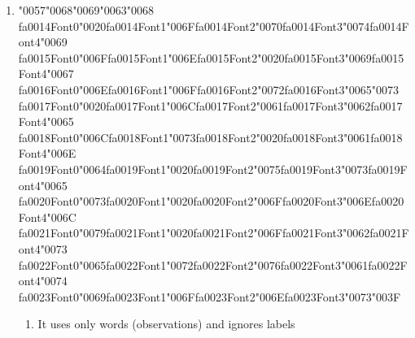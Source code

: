 \documentclass[12pt]{article}
\begin{document}
\begin{enumerate}[label=Q\arabic*.]
\begin{enumerate}[label=(\Alph*)]
    \item Beginning of an entity
    \item Inside an entity
    \item Outside any entity
    \item Between two tokens
\end{enumerate}
\item {\char"0057}{\char"0068}{\char"0069}{\char"0063}{\char"0068} {\csname fa0014Font0\endcsname\char"0020}{\csname fa0014Font1\endcsname\char"006F}{\csname fa0014Font2\endcsname\char"0070}{\csname fa0014Font3\endcsname\char"0074}{\csname fa0014Font4\endcsname\char"0069} {\csname fa0015Font0\endcsname\char"006F}{\csname fa0015Font1\endcsname\char"006E}{\csname fa0015Font2\endcsname\char"0020}{\csname fa0015Font3\endcsname\char"0069}{\csname fa0015Font4\endcsname\char"0067} {\csname fa0016Font0\endcsname\char"006E}{\csname fa0016Font1\endcsname\char"006F}{\csname fa0016Font2\endcsname\char"0072}{\csname fa0016Font3\endcsname\char"0065}{\char"0073} {\csname fa0017Font0\endcsname\char"0020}{\csname fa0017Font1\endcsname\char"006C}{\csname fa0017Font2\endcsname\char"0061}{\csname fa0017Font3\endcsname\char"0062}{\csname fa0017Font4\endcsname\char"0065} {\csname fa0018Font0\endcsname\char"006C}{\csname fa0018Font1\endcsname\char"0073}{\csname fa0018Font2\endcsname\char"0020}{\csname fa0018Font3\endcsname\char"0061}{\csname fa0018Font4\endcsname\char"006E} {\csname fa0019Font0\endcsname\char"0064}{\csname fa0019Font1\endcsname\char"0020}{\csname fa0019Font2\endcsname\char"0075}{\csname fa0019Font3\endcsname\char"0073}{\csname fa0019Font4\endcsname\char"0065} {\csname fa0020Font0\endcsname\char"0073}{\csname fa0020Font1\endcsname\char"0020}{\csname fa0020Font2\endcsname\char"006F}{\csname fa0020Font3\endcsname\char"006E}{\csname fa0020Font4\endcsname\char"006C} {\csname fa0021Font0\endcsname\char"0079}{\csname fa0021Font1\endcsname\char"0020}{\csname fa0021Font2\endcsname\char"006F}{\csname fa0021Font3\endcsname\char"0062}{\csname fa0021Font4\endcsname\char"0073} {\csname fa0022Font0\endcsname\char"0065}{\csname fa0022Font1\endcsname\char"0072}{\csname fa0022Font2\endcsname\char"0076}{\csname fa0022Font3\endcsname\char"0061}{\csname fa0022Font4\endcsname\char"0074} {\csname fa0023Font0\endcsname\char"0069}{\csname fa0023Font1\endcsname\char"006F}{\csname fa0023Font2\endcsname\char"006E}{\csname fa0023Font3\endcsname\char"0073}{\char"003F}
\begin{enumerate}[label=(\Alph*)]
    \item It uses only words (observations) and ignores labels

\end{enumerate}
\end{enumerate}
\end{document}
